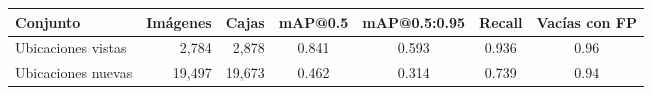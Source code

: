 \begin{tabular}{lrrcccc}
\hline
Conjunto & Im\'agenes & Cajas & mAP@0.5 & mAP@0.5:0.95 & Recall & Vac\'ias con FP \\
\hline
Ubicaciones vistas & 2,784 & 2,878 & 0.841 & 0.593 & 0.936 & 0.96 \\
Ubicaciones nuevas & 19,497 & 19,673 & 0.462 & 0.314 & 0.739 & 0.94 \\
\hline
\end{tabular}
